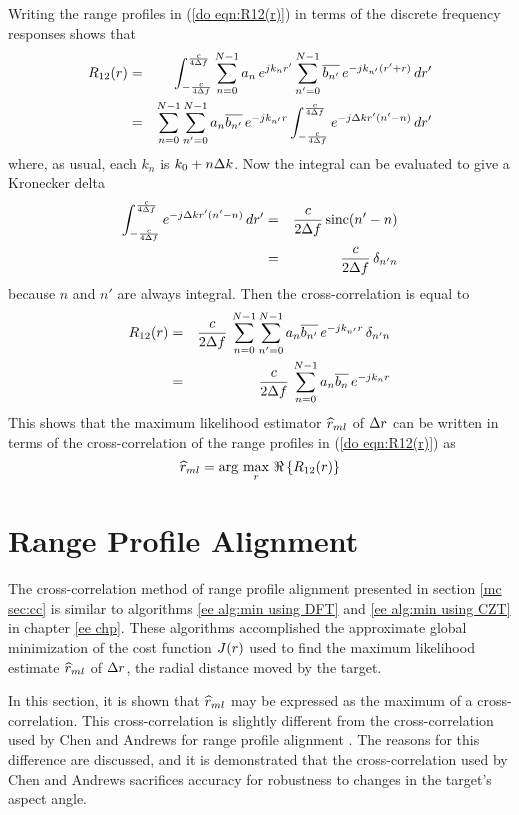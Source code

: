 Writing the range profiles in (\ref{do eqn:R12(r)}) in terms of the discrete
frequency responses shows that
\begin{eqnarray}
R_{12}(r)
&=&\int_{-\frac{c}{4{\Delta f}}}^{\frac{c}{4{\Delta f}}}
\sum_{n=0}^{N-1} a_n\,e^{jk_nr'}
\sum_{n'=0}^{N-1} \overline{b_{n'}}\,e^{-jk_{n'}(r'+r)}\,dr'	{\nonumber}\\
&=&\sum_{n=0}^{N-1} \sum_{n'=0}^{N-1} a_n\overline{b_{n'}}\,e^{-jk_{n'}r}
\int_{-\frac{c}{4{\Delta f}}}^{\frac{c}{4{\Delta f}}}
e^{-j{\Delta k} r'(n'-n)}\,dr'	
\end{eqnarray}
where, as usual, each $k_n$ is $k_0+n{\Delta k}$. Now the integral can be
evaluated to give a Kronecker delta
\begin{eqnarray}
\int_{-\frac{c}{4{\Delta f}}}^{\frac{c}{4{\Delta f}}}e^{-j{\Delta k} r'(n'-n)}\,dr'	
&=&\frac{c}{2{\Delta f}}\,{\mathop{\rm sinc}\nolimits}(n'-n){\nonumber}\\
&=&\frac{c}{2{\Delta f}}\,\delta_{n'n}
\end{eqnarray}
because $n$ and $n'$ are always integral.  Then the cross-correlation is
equal to
\begin{eqnarray}
R_{12}(r)
&=&\frac{c}{2{\Delta f}}\,\sum_{n=0}^{N-1} \sum_{n'=0}^{N-1} 
a_n\overline{b_{n'}}\,e^{-jk_{n'}r}\,\delta_{n'n}{\nonumber}\\
&=&\frac{c}{2{\Delta f}}\,\sum_{n=0}^{N-1} a_n\overline{b_n}\,e^{-jk_nr}
\end{eqnarray}
This shows that the maximum likelihood estimator $\widehat{r}_{ml}$ of ${\Delta r}$ can be
written in terms of the cross-correlation of the range profiles in 
(\ref{do eqn:R12(r)}) as
\begin{equation}
\label{do eqn:cc rML}
\widehat{r}_{ml}=\arg\,\max_{{r}}\,\Re\left\{R_{12}(r)\right\}
\end{equation}

\section{Range Profile Alignment}
\label{do sec:rpa}

The cross-correlation method of range profile alignment presented in
section \ref{mc sec:cc} is similar to algorithms \ref{ee alg:min using DFT}
and \ref{ee alg:min using CZT} in chapter \ref{ee chp}.  These algorithms
accomplished the approximate global minimization of the cost function
$J({r})$ used to find the maximum likelihood estimate $\widehat{r}_{ml}$ of ${\Delta r}$, the
radial distance moved by the target.

In this section, it is shown that $\widehat{r}_{ml}$ may be expressed as the maximum of
a cross-correlation.  This cross-correlation is slightly different from the
cross-correlation used by Chen and Andrews for range profile alignment 
\cite{Che80a}.  The reasons for this difference are discussed, and it is
demonstrated that the cross-correlation used by Chen and Andrews sacrifices
accuracy for robustness to changes in the target's aspect angle.

